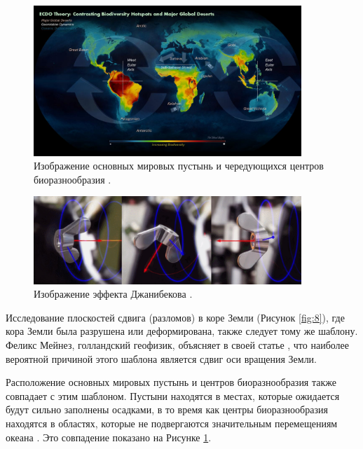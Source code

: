 \documentclass[10pt,twocolumn,letterpaper]{article}
\begin{document}
\begin{figure}[t]
\begin{center}
\includegraphics[width=0.9\textwidth]{biodiversity.jpg}
\end{center}
   \caption{Изображение основных мировых пустынь и чередующихся центров биоразнообразия \cite{28}.}
\label{fig:9}
\end{figure}

\begin{figure}[b]
\begin{center}
\includegraphics[width=0.9\textwidth]{dzhani.jpg}
\end{center}
   \caption{Изображение эффекта Джанибекова \cite{28}.}
\label{fig:10}
\end{figure}

Исследование плоскостей сдвига (разломов) в коре Земли (Рисунок \ref{fig:8}), где кора Земли была разрушена или деформирована, также следует тому же шаблону. Феликс Мейнез, голландский геофизик, объясняет в своей статье \cite{36}, что наиболее вероятной причиной этого шаблона является сдвиг оси вращения Земли.

Расположение основных мировых пустынь и центров биоразнообразия также совпадает с этим шаблоном. Пустыни находятся в местах, которые ожидается будут сильно заполнены осадками, в то время как центры биоразнообразия находятся в областях, которые не подвергаются значительным перемещениям океана \cite{28}. Это совпадение показано на Рисунке \ref{fig:9}.
\end{document}
